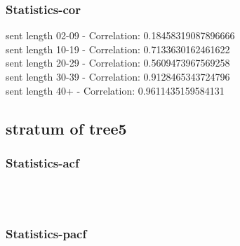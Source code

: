 \documentclass{article}%
\begin{document}
%
\newpage%
\subsubsection{Statistics{-}cor}%
\label{ssubsec:Statistics{-}cor}%
\noindent%
sent length 02-09 - Correlation: 0.18458319087896666\\%
sent length 10-19 - Correlation: 0.7133630162461622\\%
sent length 20-29 - Correlation: 0.5609473967569258\\%
sent length 30-39 - Correlation: 0.9128465343724796\\%
sent length 40+ - Correlation: 0.9611435159584131\\

%
\newpage

%
\subsection{stratum of tree5}%
\label{subsec:stratumoftree5}%
\subsubsection{Statistics{-}acf}%
\label{ssubsec:Statistics{-}acf}%


\begin{figure}[ht]%
\centering%
\setlength{\abovecaptionskip}{-35pt}%
%
%
\\%
%
%
\\%
%
\end{figure}

%
\newpage%
\subsubsection{Statistics{-}pacf}%
\label{ssubsec:Statistics{-}pacf}%
\end{document}
